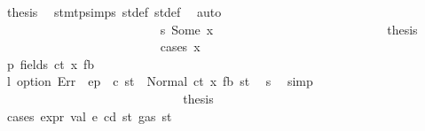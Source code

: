 \begin{isabellebody}
\ {\isacharquery}{\kern0pt}thesis\ \isamarkupfalse%
\ stmt{\isachardot}{\kern0pt}psimps{\isacharparenleft}{\kern0pt}{}{\isacharparenright}{\kern0pt}\ st{\isacharprime}{\kern0pt}{\isacharunderscore}{\kern0pt}def\ st{\isacharprime}{\kern0pt}{\isacharprime}{\kern0pt}{\isacharunderscore}{\kern0pt}def\ \isamarkupfalse%
\ auto\isanewline
\ \ \ \ \ \ \ \ \ \ \ \ \ \ \ \ \ \ \ \ \ \ \isamarkupfalse%
\isanewline
\ \ \ \ \ \ \ \ \ \ \ \ \ \ \ \ \ \ \ \ \ \ \ \ \isamarkupfalse%
\ s{}{\isacharcolon}{\kern0pt}\ {\isacharparenleft}{\kern0pt}Some\ x{\isacharparenright}{\kern0pt}\isanewline
\ \ \ \ \ \ \ \ \ \ \ \ \ \ \ \ \ \ \ \ \ \ \ \ \isamarkupfalse%
\ \isamarkupfalse%
\ {\isacharquery}{\kern0pt}thesis\isanewline
\ \ \ \ \ \ \ \ \ \ \ \ \ \ \ \ \ \ \ \ \ \ \ \ \isamarkupfalse%
\ {\isacharparenleft}{\kern0pt}cases\ x{\isacharparenright}{\kern0pt}\isanewline
\ \ \ \ \ \ \ \ \ \ \ \ \ \ \ \ \ \ \ \ \ \ \ \ \ \ \isamarkupfalse%
\ p{}{\isacharcolon}{\kern0pt}\ {\isacharparenleft}{\kern0pt}fields\ ct\ x{}\ fb{\isacharparenright}{\kern0pt}\isanewline
\ \ \ \ \ \ \ \ \ \ \ \ \ \ \ \ \ \ \ \ \ \ \ \ \ \ \isamarkupfalse%
\ \isamarkupfalse%
\ l{}{\isacharcolon}{\kern0pt}\ {\isachardoublequoteopen}option\ Err\ {\isacharparenleft}{\kern0pt}{\isasymlambda}{\isacharunderscore}{\kern0pt}{\isachardot}{\kern0pt}\ ep\ {\isachardollar}{\kern0pt}{\isachardollar}{\kern0pt}\ c{\isacharparenright}{\kern0pt}\ st{\isacharprime}{\kern0pt}{\isacharprime}{\kern0pt}\ {\isacharequal}{\kern0pt}\ Normal\ {\isacharparenleft}{\kern0pt}{\isacharparenleft}{\kern0pt}ct{\isacharcomma}{\kern0pt}\ x{}{\isacharcomma}{\kern0pt}\ fb{\isacharparenright}{\kern0pt}{\isacharcomma}{\kern0pt}\ st{\isacharprime}{\kern0pt}{\isacharprime}{\kern0pt}{\isacharparenright}{\kern0pt}{\isachardoublequoteclose}\ \isamarkupfalse%
\ s{}\ \isamarkupfalse%
\ simp\isanewline
\ \ \ \ \ \ \ \ \ \ \ \ \ \ \ \ \ \ \ \ \ \ \ \ \ \ \isamarkupfalse%
\ \isamarkupfalse%
\ {\isacharquery}{\kern0pt}thesis\isanewline
\ \ \ \ \ \ \ \ \ \ \ \ \ \ \ \ \ \ \ \ \ \ \ \ \ \ \isamarkupfalse%
\ {\isacharparenleft}{\kern0pt}cases\ {\isachardoublequoteopen}expr\ val\ e\ cd\ st{\isacharprime}{\kern0pt}{\isacharprime}{\kern0pt}\ {\isacharparenleft}{\kern0pt}gas\ st{\isacharprime}{\kern0pt}{\isacharprime}{\kern0pt}{\isacharparenright}{\kern0pt}{\isachardoublequoteclose}{\isacharparenright}{\kern0pt}\isanewline

\end{isabellebody}
